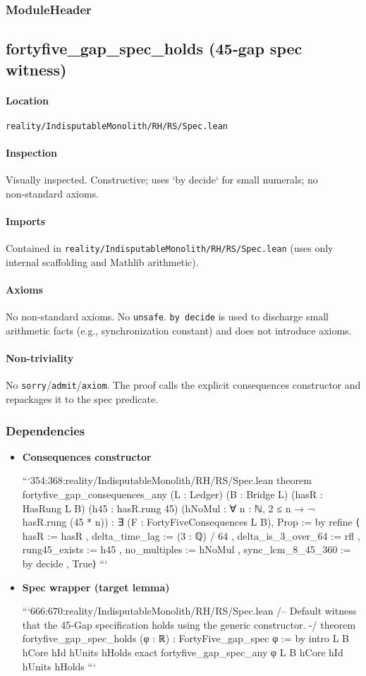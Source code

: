 \documentclass{article}
\newcommand{\FileRef}[1]{\texttt{#1}}
\newcommand{\ModuleHeader}[3]{%
  \subsection{#1}
  \paragraph{Location} \FileRef{#2}\\
  \paragraph{Inspection} #3
}
\begin{document}
\subsubsection{ModuleHeader}
\ModuleHeader{fortyfive\_gap\_spec\_holds (45‑gap spec witness)}{reality/IndisputableMonolith/RH/RS/Spec.lean}{Visually inspected. Constructive; uses `by decide` for small numerals; no non‑standard axioms.}

\paragraph{Imports}
Contained in \FileRef{reality/IndisputableMonolith/RH/RS/Spec.lean} (uses only internal scaffolding and Mathlib arithmetic).

\paragraph{Axioms}
No non‑standard axioms. No \texttt{unsafe}. \texttt{by decide} is used to discharge small arithmetic facts (e.g., synchronization constant) and does not introduce axioms.

\paragraph{Non-triviality}
No \texttt{sorry}/\texttt{admit}/\texttt{axiom}. The proof calls the explicit consequences constructor and repackages it to the spec predicate.

\subsubsection{Dependencies}
\begin{itemize}[leftmargin=*]
  \item \textbf{Consequences constructor}

```354:368:reality/IndisputableMonolith/RH/RS/Spec.lean
theorem fortyfive_gap_consequences_any (L : Ledger) (B : Bridge L)
  (hasR : HasRung L B)
  (h45 : hasR.rung 45)
  (hNoMul : ∀ n : ℕ, 2 ≤ n → ¬ hasR.rung (45 * n)) :
  ∃ (F : FortyFiveConsequences L B), Prop := by
  refine ⟨{
      hasR := hasR
    , delta_time_lag := (3 : ℚ) / 64
    , delta_is_3_over_64 := rfl
    , rung45_exists := h45
    , no_multiples := hNoMul
    , sync_lcm_8_45_360 := by decide
    }, True⟩
```

  \item \textbf{Spec wrapper (target lemma)}

```666:670:reality/IndisputableMonolith/RH/RS/Spec.lean
/-- Default witness that the 45‑Gap specification holds using the generic constructor. -/
 theorem fortyfive_gap_spec_holds (φ : ℝ) : FortyFive_gap_spec φ := by
  intro L B hCore hId hUnits hHolds
  exact fortyfive_gap_spec_any φ L B hCore hId hUnits hHolds
```
\end{itemize}
\end{document}
